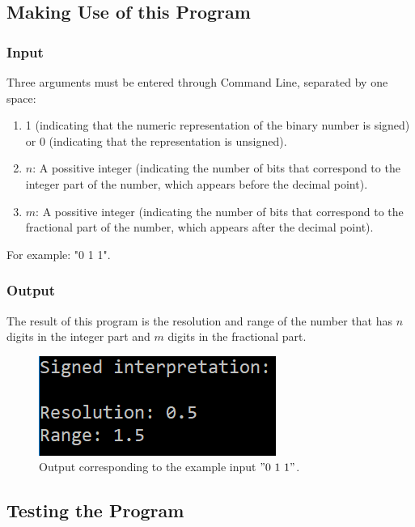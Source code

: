 \documentclass[a4paper,12pt]{report}
\begin{document}
\subsection{\color{purple}Making Use of this Program}
\subsubsection{\color{orange}Input}
Three arguments must be entered through Command Line, separated by one space:
\begin{enumerate}
\item  1 (indicating that the numeric representation of the binary number is signed) or 0 (indicating that the representation is unsigned).
\item $n$: A possitive integer (indicating the number of bits that correspond to the integer part of the number, which appears before the decimal point).
\item  $m$: A possitive integer (indicating the number of bits that correspond to the fractional part of the number, which appears after the decimal point).
\end{enumerate}
{\color{cyan}For example: "0 1 1"}.

\subsubsection{\color{orange}Output}
The result of this program is the resolution and range of the number that has $n$ digits in the integer part and $m$ digits in the fractional part.

\begin{figure}[h!]
\centering
\includegraphics[scale=1]{ejemploOutput}
\caption{\color{cyan}Output corresponding to the example input $"0\ 1\ 1"$.}
\label{image output}
\end{figure}

\subsection{\color{purple}Testing the Program}
\end{document}
